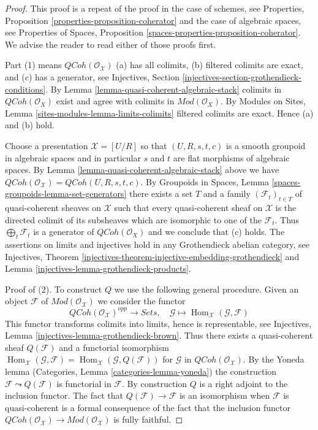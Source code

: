 \documentclass{stacks-project}
\theoremstyle{plain}
\theoremstyle{definition}
\theoremstyle{remark}
\numberwithin{equation}{subsection}
\def\Hom{\mathop{\mathrm{Hom}}\nolimits}
\def\QCoh{\mathit{QCoh}}
\begin{document}
\begin{proof}
This proof is a repeat of the proof in the case of schemes, see
Properties, Proposition \ref{properties-proposition-coherator}
and the case of algebraic spaces, see
Properties of Spaces, Proposition
\ref{spaces-properties-proposition-coherator}.
We advise the reader to read either of those proofs first.

\medskip\noindent
Part (1) means $\QCoh(\mathcal{O}_\mathcal{X})$ (a) has all colimits,
(b) filtered colimits are exact, and (c) has a generator, see
Injectives, Section \ref{injectives-section-grothendieck-conditions}.
By Lemma \ref{lemma-quasi-coherent-algebraic-stack}
colimits in $\QCoh(\mathcal{O}_X)$ exist and agree
with colimits in $\textit{Mod}(\mathcal{O}_X)$. By
Modules on Sites, Lemma \ref{sites-modules-lemma-limits-colimits}
filtered colimits are exact. Hence (a) and (b) hold.

\medskip\noindent
Choose a presentation $\mathcal{X} = [U/R]$ so that $(U, R, s, t, c)$
is a smooth groupoid in algebraic spaces and in particular $s$ and $t$
are flat morphisms of algebraic spaces. By
Lemma \ref{lemma-quasi-coherent-algebraic-stack}
above we have
$\QCoh(\mathcal{O}_\mathcal{X}) = \QCoh(U, R, s, t, c)$.
By Groupoids in Spaces, Lemma \ref{spaces-groupoids-lemma-set-generators}
there exists a set $T$ and a family $(\mathcal{F}_t)_{t \in T}$ of
quasi-coherent sheaves on $\mathcal{X}$ such that every quasi-coherent
sheaf on $\mathcal{X}$ is the directed colimit of its subsheaves
which are isomorphic to one of the $\mathcal{F}_t$.
Thus $\bigoplus_t \mathcal{F}_t$ is
a generator of $\QCoh(\mathcal{O}_X)$ and we conclude that (c) holds.
The assertions on limits and injectives hold in any
Grothendieck abelian category, see
Injectives, Theorem
\ref{injectives-theorem-injective-embedding-grothendieck} and
Lemma \ref{injectives-lemma-grothendieck-products}.

\medskip\noindent
Proof of (2). To construct $Q$ we use the following general procedure.
Given an object $\mathcal{F}$ of $\textit{Mod}(\mathcal{O}_\mathcal{X})$
we consider the functor
$$
\QCoh(\mathcal{O}_\mathcal{X})^{opp}
\longrightarrow
\textit{Sets},
\quad
\mathcal{G}
\longmapsto
\Hom_\mathcal{X}(\mathcal{G}, \mathcal{F})
$$
This functor transforms colimits into limits,
hence is representable, see
Injectives, Lemma \ref{injectives-lemma-grothendieck-brown}.
Thus there exists a quasi-coherent sheaf $Q(\mathcal{F})$
and a functorial isomorphism
$\Hom_\mathcal{X}(\mathcal{G}, \mathcal{F}) =
\Hom_\mathcal{X}(\mathcal{G}, Q(\mathcal{F}))$
for $\mathcal{G}$ in $\QCoh(\mathcal{O}_\mathcal{X})$.
By the Yoneda lemma
(Categories, Lemma \ref{categories-lemma-yoneda})
the construction $\mathcal{F} \leadsto Q(\mathcal{F})$ is
functorial in $\mathcal{F}$. By construction $Q$ is a right
adjoint to the inclusion functor.
The fact that $Q(\mathcal{F}) \to \mathcal{F}$ is an isomorphism
when $\mathcal{F}$ is quasi-coherent is a formal consequence of the fact
that the inclusion functor
$\QCoh(\mathcal{O}_\mathcal{X}) \to
\textit{Mod}(\mathcal{O}_\mathcal{X})$
is fully faithful.
\end{proof}
\end{document}

